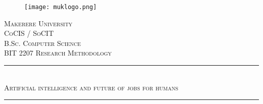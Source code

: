 \documentclass[12pt, a4paper]{report}
\begin{document}
\begin{titlepage}

\newcommand{\HRule}{\rule{\linewidth}{0.1mm}} %

\center %


\begin{figure}
    \centering
  \texttt{[image: muklogo.png]}
\end{figure}
 

\textsc{\LARGE Makerere University}\\[0.7cm] %
\textsc{\Large CoCIS / SoCIT}\\[0.2cm] %
\textsc{\large B.Sc. Computer Science}\\[0.1cm] %
\textsc{\small BIT 2207 Research Methodology}\\[0.8cm]


\HRule \\[0.6cm]
\textsc{\Large Artificial intelligence and future of jobs for humans}\\[0.6cm]
\HRule \\[1.0cm]
 



\end{titlepage}
\end{document}
